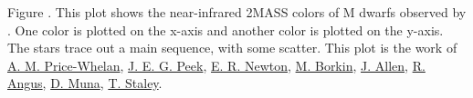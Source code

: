 Figure \label{fig:1}. This plot shows the near-infrared 2MASS colors of M dwarfs observed by \citet{2014AJ....147...20N}. One color is plotted on the x-axis and another color is plotted on the y-axis. The stars trace out a main sequence, with some scatter. This plot is the work of \href{http://adrian.pw}{A. M. Price-Whelan}, \href{http://www.astro.columbia.edu/~jpeek/}{J. E. G. Peek}, \href{https://www.cfa.harvard.edu/~enewton/}{E. R. Newton}, \href{http://people.seas.harvard.edu/~borkin/}{M. Borkin}, \href{http://www.physics.usyd.edu.au/~jallen/}{J. Allen}, \href{http://www.ruthangus.co.uk/}{R. Angus}, \href{}{D. Muna}, \href{http://www.ast.cam.ac.uk/~ts337/}{T. Staley}. 